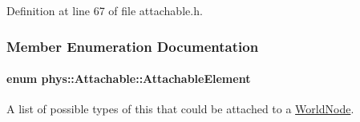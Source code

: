 Definition at line 67 of file attachable.h.



\subsubsection{Member Enumeration Documentation}
\hypertarget{classphys_1_1Attachable_acd1fca033e7cc0bb3024a92d466d213a}{
\paragraph[{AttachableElement}]{\setlength{\rightskip}{0pt plus 5cm}enum {\bf phys::Attachable::AttachableElement}}\hfill}
\label{df/dbd/classphys_1_1Attachable_acd1fca033e7cc0bb3024a92d466d213a}


A list of possible types of this that could be attached to a \hyperlink{classphys_1_1WorldNode}{WorldNode}. 

